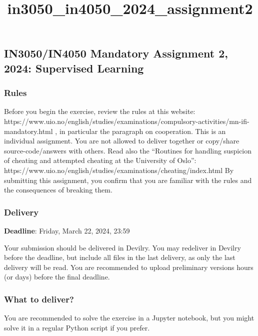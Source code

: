 \documentclass[11pt]{article}
\title{in3050\_in4050\_2024\_assignment2}
\begin{document}
    
    \maketitle
    
    

    
    \hypertarget{in3050in4050-mandatory-assignment-2-2024-supervised-learning}{%
\subsection{IN3050/IN4050 Mandatory Assignment 2, 2024: Supervised
Learning}\label{in3050in4050-mandatory-assignment-2-2024-supervised-learning}}

    \hypertarget{rules}{%
\subsubsection{Rules}\label{rules}}

Before you begin the exercise, review the rules at this website:
https://www.uio.no/english/studies/examinations/compulsory-activities/mn-ifi-mandatory.html
, in particular the paragraph on cooperation. This is an individual
assignment. You are not allowed to deliver together or copy/share
source-code/answers with others. Read also the ``Routines for handling
suspicion of cheating and attempted cheating at the University of
Oslo'':
https://www.uio.no/english/studies/examinations/cheating/index.html By
submitting this assignment, you confirm that you are familiar with the
rules and the consequences of breaking them.

\hypertarget{delivery}{%
\subsubsection{Delivery}\label{delivery}}

\textbf{Deadline}: Friday, March 22, 2024, 23:59

Your submission should be delivered in Devilry. You may redeliver in
Devilry before the deadline, but include all files in the last delivery,
as only the last delivery will be read. You are recommended to upload
preliminary versions hours (or days) before the final deadline.

\hypertarget{what-to-deliver}{%
\subsubsection{What to deliver?}\label{what-to-deliver}}

You are recommended to solve the exercise in a Jupyter notebook, but you
might solve it in a regular Python script if you prefer.
\end{document}
